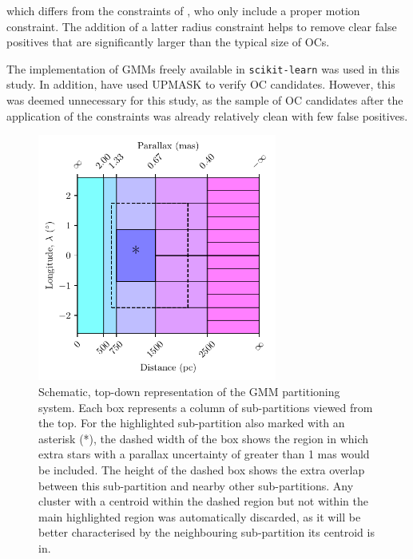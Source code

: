 \noindent
which differs from the constraints of \cite{cantat-gaudin_gaia_2019}, who only include a proper motion constraint. The addition of a latter radius constraint helps to remove clear false positives that are significantly larger than the typical size of OCs.

The implementation of GMMs freely available in \texttt{scikit-learn} \citep{pedregosa_scikit-learn_2011} was used in this study. In addition, \cite{cantat-gaudin_gaia_2019} have used UPMASK \citep{krone-martins_upmask:_2014} to verify OC candidates. However, this was deemed unnecessary for this study, as the sample of OC candidates after the application of the constraints was already relatively clean with few false positives.

\begin{figure}[t]
   \centering
   \includegraphics[width=0.7\textwidth]{fig/c2/fig_gmm.pdf}
   \caption{Schematic, top-down representation of the GMM partitioning system. Each box represents a column of sub-partitions viewed from the top. For the highlighted sub-partition also marked with an asterisk (*), the dashed width of the box shows the region in which extra stars with a parallax uncertainty of greater than 1 mas would be included. The height of the dashed box shows the extra overlap between this sub-partition and nearby other sub-partitions. Any cluster with a centroid within the dashed region but not within the main highlighted region was automatically discarded, as it will be better characterised by the neighbouring sub-partition its centroid is in.}\label{c2:fig:gmm}%
\end{figure}

